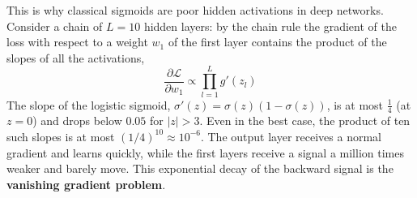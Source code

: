 This is why classical sigmoids are poor hidden activations in deep networks.
Consider a chain of $L = 10$ hidden layers: by the chain rule the gradient of the
loss with respect to a weight $w_1$ of the first layer contains the product of the
slopes of all the activations,
\begin{equation*}
    \frac{\partial \mathcal{L}}{\partial w_1} \propto \prod_{l=1}^{L} g'(z_l)
\end{equation*}
The slope of the logistic sigmoid, $\sigma'(z) = \sigma(z)(1-\sigma(z))$, is at
most $\frac{1}{4}$ (at $z = 0$) and drops below $0.05$ for $|z| > 3$. Even in the
best case, the product of ten such slopes is at most $(1/4)^{10} \approx 10^{-6}$.
The output layer receives a normal gradient and learns quickly, while the first
layers receive a signal a million times weaker and barely move. This exponential
decay of the backward signal is the \textbf{vanishing gradient problem}.

